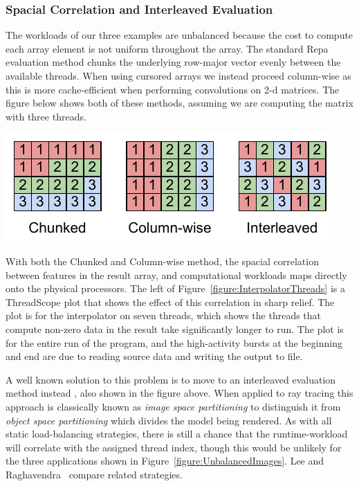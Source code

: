 \subsubsection{Spacial Correlation and Interleaved Evaluation}
\label{section:Interleaved}
The workloads of our three examples are unbalanced because the cost to compute each array element is not uniform throughout the array. The standard Repa evaluation method chunks the underlying row-major vector evenly between the available threads. When using cursored arrays we instead proceed column-wise as this is more cache-efficient when performing convolutions on 2-d matrices. The figure below shows both of these methods, assuming we are computing the matrix with three threads.
%
\begin{center}
\includegraphics[scale=0.8]{figs/guiding-eval-order}
\end{center}
%
With both the Chunked and Column-wise method, the spacial correlation between features in the result array, and computational workloads maps directly onto the physical processors. The left of Figure~\ref{figure:InterpolatorThreads} is a ThreadScope plot that shows the effect of this correlation in sharp relief. The plot is for the interpolator on seven threads, which shows the threads that compute non-zero data in the result take significantly longer to run. The plot is for the entire run of the program, and the high-activity bursts at the beginning and end are due to reading source data and writing the output to file.

A well known solution to this problem is to move to an interleaved evaluation method instead \cite{Salmon:RayTracer}, also shown in the figure above. When applied to ray tracing this approach is classically known as \emph{image space partitioning} to distinguish it from \emph{object space partitioning} which divides the model being rendered. As with all static load-balancing strategies, there is still a chance that the runtime-workload will correlate with the assigned thread index, though this would be unlikely for the three applications shown in Figure~\ref{figure:UnbalancedImages}. Lee and Raghavendra~\cite{Lee:RayTracerLoadBalancing} compare related strategies. 


